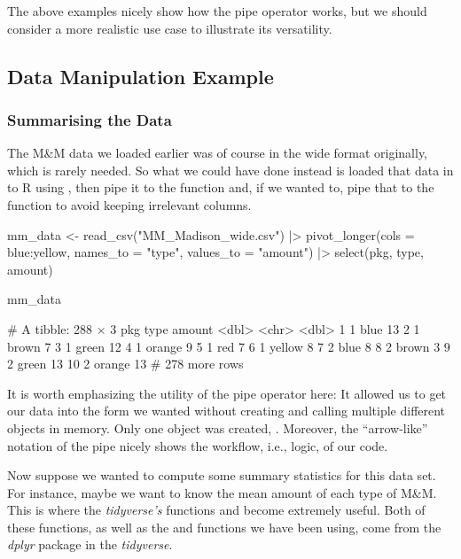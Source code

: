 The above examples nicely show how the pipe operator works, but we should consider a more realistic use case to illustrate its versatility. 

\subsection{Data Manipulation Example}

\subsubsection{Summarising the Data}

The M\&M data we loaded earlier was of course in the wide format originally, which is rarely needed. So what we could have done instead is loaded that data in to R using , then pipe it to the  function and, if we wanted to, pipe that to the  function to avoid keeping irrelevant columns.

\begin{inR}
mm_data <- read_csv("MM_Madison_wide.csv") |>
  pivot_longer(cols = blue:yellow, names_to = "type", values_to = "amount") |>
  select(pkg, type, amount)

mm_data
\end{inR}
\begin{outR}
# A tibble: 288 × 3
     pkg type   amount
   <dbl> <chr>   <dbl>
 1     1 blue       13
 2     1 brown       7
 3     1 green      12
 4     1 orange      9
 5     1 red         7
 6     1 yellow      8
 7     2 blue        8
 8     2 brown       3
 9     2 green      13
10     2 orange     13
# 278 more rows
\end{outR}

It is worth emphasizing the utility of the pipe operator here: It allowed us to get our data into the form we wanted without creating and calling multiple different objects in memory. Only one object was created, . Moreover, the ``arrow-like'' notation of the pipe \R{|>} nicely shows the workflow, i.e., logic, of our code.

Now suppose we wanted to compute some summary statistics for this data set.  For instance, maybe we want to know the mean amount of each type of M\&M. This is where the \textit{tidyverse's} functions  and  become extremely useful. Both of these functions, as well as the  and  functions we have been using, come from the \textit{dplyr} package in the \textit{tidyverse}. 

